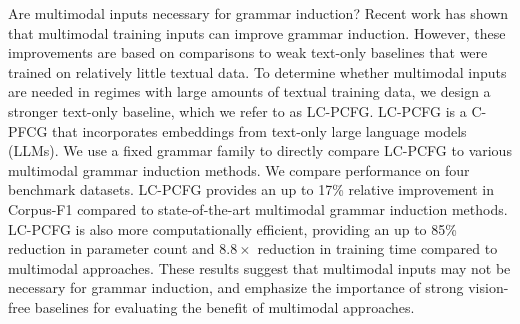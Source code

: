 Are multimodal inputs necessary for grammar induction? Recent work has shown that multimodal training inputs can improve grammar induction. However, these improvements are based on comparisons to weak text-only baselines that were trained on relatively little textual data. To determine whether multimodal inputs are needed in regimes with large amounts of textual training data, we design a stronger text-only baseline, which we refer to as LC-PCFG.  LC-PCFG is a C-PFCG that incorporates embeddings from text-only large language models (LLMs). We use a fixed grammar family to directly compare LC-PCFG to various multimodal grammar induction methods. We compare performance on four benchmark datasets. LC-PCFG provides an up to 17\% relative improvement in Corpus-F1 compared to state-of-the-art multimodal grammar induction methods. LC-PCFG is also more computationally efficient, providing an up to 85\% reduction in parameter count and $8.8\times$ reduction in training time compared to multimodal approaches. These results suggest that multimodal inputs may not be necessary for grammar induction, and emphasize the importance of strong vision-free baselines for evaluating the benefit of multimodal approaches.